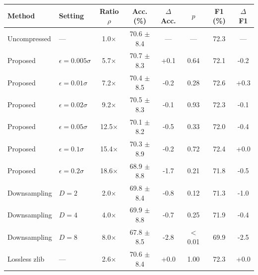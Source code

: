\begin{tabular}{llcccccc}
\toprule
Method & Setting & Ratio $\rho$ & Acc. (\%) & $\Delta$Acc. & $p$ & F1 (\%) & $\Delta$F1 \\
\midrule
Uncompressed & --- & 1.0$\times$ & 70.6 $\pm$ 8.4 & --- & --- & 72.3 & --- \\
Proposed & $\epsilon=0.005\sigma$ & 5.7$\times$ & 70.7 $\pm$ 8.3 & +0.1 & 0.64 & 72.1 & -0.2 \\
Proposed & $\epsilon=0.01\sigma$ & 7.2$\times$ & 70.4 $\pm$ 8.5 & -0.2 & 0.28 & 72.6 & +0.3 \\
Proposed & $\epsilon=0.02\sigma$ & 9.2$\times$ & 70.5 $\pm$ 8.3 & -0.1 & 0.93 & 72.3 & -0.1 \\
Proposed & $\epsilon=0.05\sigma$ & 12.5$\times$ & 70.1 $\pm$ 8.2 & -0.5 & 0.33 & 72.0 & -0.4 \\
Proposed & $\epsilon=0.1\sigma$ & 15.4$\times$ & 70.3 $\pm$ 8.9 & -0.2 & 0.72 & 72.4 & +0.0 \\
Proposed & $\epsilon=0.2\sigma$ & 18.6$\times$ & 68.9 $\pm$ 8.8 & -1.7 & 0.21 & 71.8 & -0.5 \\
Downsampling & $D=2$ & 2.0$\times$ & 69.8 $\pm$ 8.4 & -0.8 & 0.12 & 71.3 & -1.0 \\
Downsampling & $D=4$ & 4.0$\times$ & 69.9 $\pm$ 8.8 & -0.7 & 0.25 & 71.9 & -0.4 \\
Downsampling & $D=8$ & 8.0$\times$ & 67.8 $\pm$ 8.5 & -2.8 & $<$0.01 & 69.9 & -2.5 \\
Lossless zlib & --- & 2.6$\times$ & 70.6 $\pm$ 8.4 & +0.0 & 1.00 & 72.3 & +0.0 \\
\bottomrule
\end{tabular}
